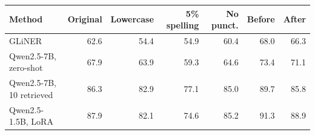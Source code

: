 \begingroup\small\setlength{\tabcolsep}{3pt}
\begin{tabular*}{\linewidth}{@{\extracolsep{\fill}}lrrrrrr@{}}
\toprule
Method & Original & Lowercase & 5\% spelling & No punct. & Before & After \\
\midrule
GLiNER & 62.6 & 54.4 & 54.9 & 60.4 & 68.0 & 66.3 \\
Qwen2.5-7B, zero-shot & 67.9 & 63.9 & 59.3 & 64.6 & 73.4 & 71.1 \\
Qwen2.5-7B, 10 retrieved & 86.3 & 82.9 & 77.1 & 85.0 & 89.7 & 85.8 \\
Qwen2.5-1.5B, LoRA & 87.9 & 82.1 & 74.6 & 85.2 & 91.3 & 88.9 \\
\bottomrule
\end{tabular*}
\endgroup
